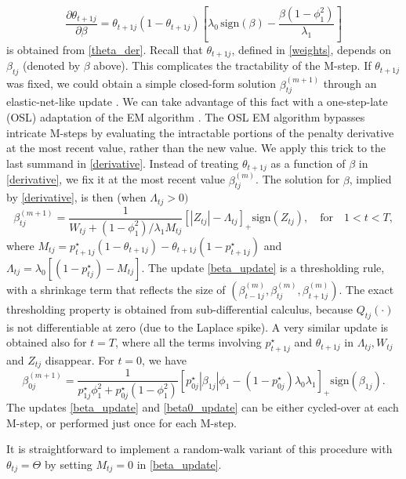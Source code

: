 \documentclass[ba]{imsart}
\numberwithin{equation}{section}
\theoremstyle{plain}
\begin{document}
$$
\frac{\partial\theta_{t+1j}}{\partial \beta}=\theta_{t+1j}(1-\theta_{t+1j})\left[\lambda_0\,\mathrm{sign}(\beta)-\frac{\beta(1-\phi_1^2)}{\lambda_1}\right]
$$
is obtained from \eqref{theta_der}.
 Recall that $\theta_{t+1j}$, defined  in \eqref{weights}, depends on $\beta_{tj}$ (denoted by $\beta$ above). This complicates the tractability of the M-step.  If $\theta_{t+1j}$ was fixed, we could obtain a simple closed-form solution $\beta_{tj}^{(m+1)}$  through an elastic-net-like update \citep{zou_hastie}.  We can take advantage of this fact with a one-step-late (OSL) adaptation of the EM algorithm \citep{green_OSL}. The OSL EM algorithm bypasses intricate  M-steps by evaluating the intractable portions of the penalty derivative   at the most recent value, rather than the new value. We apply this trick to the last summand in \eqref{derivative}.
Instead of treating $\theta_{t+1j}$ as a function of $\beta$ in 
\eqref{derivative}, we fix it at the most recent value $\beta_{tj}^{(m)}$. The solution for $\beta$, implied by \eqref{derivative}, is then (when $\Lambda_{tj}>0)$
\begin{equation}\label{beta_update}
\beta^{(m+1)}_{tj}=\frac{1}{W_{tj}+(1-\phi_1^2)/\lambda_1M_{tj}}\left[|Z_{tj}|-\Lambda_{tj}\right]_+\mathrm{sign}(Z_{tj}),\quad\text{for}\quad 1<t<T,
\end{equation}
where $M_{tj}=p^\star_{t+1j}(1-\theta_{t+1j})-\theta_{t+1j}(1-p^\star_{t+1j})$ and $\Lambda_{tj}=\lambda_0[(1-p^\star_{tj})-M_{tj}]$. The update \eqref{beta_update} is a  thresholding rule, with a shrinkage term that reflects the size of $(\beta_{t-1j}^{(m)},\beta_{tj}^{(m)},\beta_{t+1j}^{(m)})$. The exact thresholding property is obtained  from sub-differential calculus, because $Q_{tj}(\cdot)$ is not differentiable at zero (due to the Laplace spike). A very similar update is obtained also for $t=T$, where all the terms involving $p^\star_{t+1j}$ and $\theta_{t+1j}$  in $\Lambda_{tj}, W_{tj}$ and $Z_{tj}$ disappear. For $t=0$, we have
\begin{equation}\label{beta0_update}
\beta_{0j}^{(m+1)}=\frac{1}{p^\star_{1j}\phi_1^2+p^\star_{0j}(1-\phi_1^2)}\left[p^\star_{0j}|\beta_{1j}|\phi_1-(1-p^\star_{0j})\lambda_0\lambda_1\right]_+\mathrm{sign}(\beta_{1j}).
\end{equation}
The updates \eqref{beta_update} and \eqref{beta0_update} can be either cycled-over at each M-step, or performed just once for each M-step. 

{It is straightforward to implement  a random-walk variant of this procedure with $\theta_{tj}=\Theta$  by setting $M_{tj}=0$ in \eqref{beta_update}.}
\end{document}
